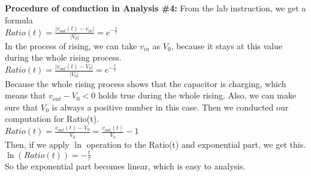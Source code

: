 \textbf{Procedure of conduction in Analysis \#4:} \newline
\phantom{ } From the lab instruction, we get a formula\\
$Ratio(t) = \frac{|v_{out}(t) - v_{in}|}{|V_0|} = e^{-\frac{t}{\tau}}$\\
\phantom{ } In the process of rising, we can take $v_{in}$ as $V_0$, because it stays at this value during the whole rising process.\\
$Ratio(t) = \frac{|v_{out}(t) - V_0|}{|V_0|} = e^{-\frac{t}{\tau}}$\\
\phantom{ } Because the whole rising process shows that the capacitor is charging, which means that $v_{out} - V_0 < 0$ holds true during the whole rising. Also, we can make sure that $V_0$ is always a positive number in this case. Then we conducted our 
computation for Ratio(t).\\
$Ratio(t) = \frac{v_{out}(t) - V_0}{V_0} = \frac{v_{out}(t)}{V_0} - 1$\\
\phantom{ } Then, if we apply $\ln$ operation to the Ratio(t) and exponential part, we get this.\\
$\ln(Ratio(t)) = -\frac{t}{\tau}$\\
\phantom{ } So the exponential part becomes linear, which is easy to analysis.